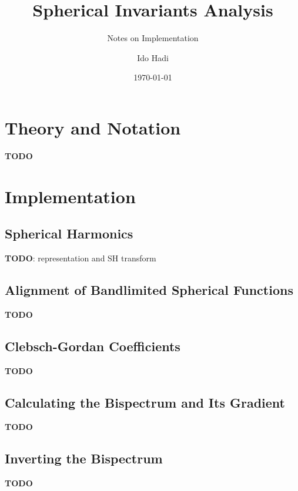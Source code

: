 \documentclass[a4paper,11pt]{scrartcl}
\title{Spherical Invariants Analysis}
\subtitle{Notes on Implementation}
\date{\today}
\author{Ido Hadi}
\begin{document}
	\maketitle
	
	\tableofcontents
	
	\section{Theory and Notation}
	\textbf{TODO}
	
	\section{Implementation}
	
	\subsection{Spherical Harmonics}
	\textbf{TODO}: representation and SH transform 
	
	\subsection{Alignment of Bandlimited Spherical Functions}
	\textbf{TODO}
	
	\subsection{Clebsch-Gordan Coefficients}
	\textbf{TODO}
	
	\subsection{Calculating the Bispectrum and Its Gradient}
	\textbf{TODO}
	
	\subsection{Inverting the Bispectrum}
	\textbf{TODO}
	
	
	\printbibliography
	
\end{document}
